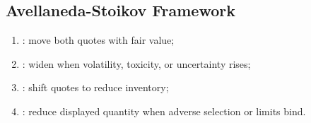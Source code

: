 \subsection{Avellaneda-Stoikov Framework}


\begin{taxonomy} 
\begin{enumerate}[label=\roman*.]
\setlength{\itemsep}{0pt}
\item {}: move both quotes with fair value;
\item {}: widen when volatility, toxicity, or uncertainty rises;
\item {}: shift quotes to reduce inventory;
\item {}: reduce displayed quantity when adverse selection or limits bind.
\end{enumerate}
\end{taxonomy}

